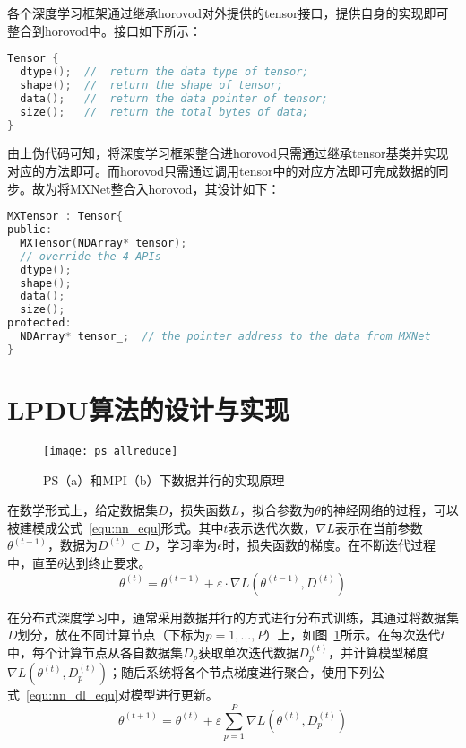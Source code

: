 各个深度学习框架通过继承horovod对外提供的tensor接口，提供自身的实现即可整合到horovod中。接口如下所示：

\begin{lstlisting}[language=C, numbers=none]
Tensor {
  dtype();  //  return the data type of tensor;
  shape();  //  return the shape of tensor;
  data();   //  return the data pointer of tensor;
  size();   //  return the total bytes of data;
}
\end{lstlisting}

由上伪代码可知，将深度学习框架整合进horovod只需通过继承tensor基类并实现对应的方法即可。而horovod只需通过调用tensor中的对应方法即可完成数据的同步。故为将MXNet整合入horovod，其设计如下：

\begin{lstlisting}[language=C, numbers=none]
MXTensor : Tensor{
public:
  MXTensor(NDArray* tensor);
  // override the 4 APIs
  dtype();
  shape();
  data();
  size();
protected:
  NDArray* tensor_;  // the pointer address to the data from MXNet
}
\end{lstlisting}

\section{LPDU算法的设计与实现}
\begin{figure}[htp]
\centering
\texttt{[image: ps\_allreduce]}
\caption{PS（a）和MPI（b）下数据并行的实现原理}
\label{fig:ps_allreduce}
\end{figure}

在数学形式上，给定数据集$D$，损失函数$L$，拟合参数为$\theta$的神经网络的过程，可以被建模成公式~\ref{equ:nn_equ}形式。其中$t$表示迭代次数，$\nabla L$表示在当前参数$\theta^{(t-1)}$，数据为$D^{(t)}\subset D$，学习率为$\epsilon$时，损失函数的梯度。在不断迭代过程中，直至$\theta$达到终止要求。
\begin{equation}
\label{equ:nn_equ}
\theta^{(t)}=\theta^{(t-1)}+\varepsilon\cdot\nabla L(\theta^{(t-1)},D^{(t)})
\end{equation}

在分布式深度学习中，通常采用数据并行的方式进行分布式训练，其通过将数据集$D$划分，放在不同计算节点（下标为$p=1,...,P$）上，如图~\ref{fig:ps_allreduce}所示。在每次迭代$t$中，每个计算节点从各自数据集$D_{p}$获取单次迭代数据$D^{(t)}_{p}$，并计算模型梯度$\nabla L(\theta^{(t)},D^{(t)}_{p})$；随后系统将各个节点梯度进行聚合，使用下列公式~\ref{equ:nn_dl_equ}对模型进行更新。
\begin{equation}
\label{equ:nn_dl_equ}
\theta^{(t+1)}=\theta^{(t)}+\varepsilon\sum^{P}_{p=1}\nabla L(\theta^{(t)},D^{(t)}_{p})
\end{equation}

